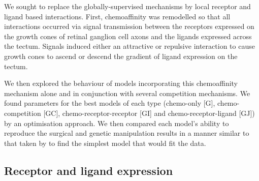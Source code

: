 \documentclass[11pt, a4paper]{article}
\begin{document}
We sought to replace the globally-supervised mechanisms by local receptor and
ligand based interactions. First, chemoaffinity was remodelled so that all
interactions occurred via signal transmission between the receptors expressed
on the growth cones of retinal ganglion cell axons and the ligands expressed
across the tectum. Signals induced either an attractive or repulsive
interaction to cause growth cones to ascend or descend the gradient of ligand
expression on the tectum.

We then explored the behaviour of models incorporating this chemoaffinity
mechanism alone and in conjunction with several competition mechanisms. We
found parameters for the best models of each type (chemo-only [G],
chemo-competition [GC], chemo-receptor-receptor [GI] and chemo-receptor-ligand
[GJ]) by an optimisation approach. We then compared each model's ability to
reproduce the surgical and genetic manipulation results in a manner similar to
that taken by \citet{simpson_simple_2011} to find the simplest model that
would fit the data.

\subsection*{Receptor and ligand expression}
\end{document}
